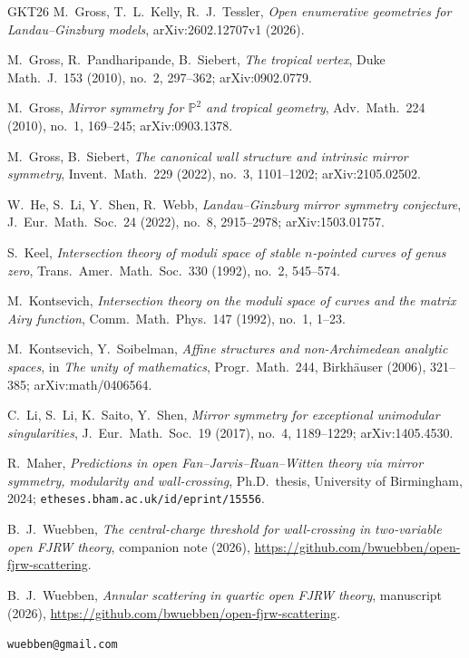 \documentclass[11pt]{amsart}
\theoremstyle{definition}
\theoremstyle{remark}
\newcommand{\PP}{\mathbb{P}}
\begin{document}
\begin{thebibliography}{GKT26}
 M.~Gross, T.~L.~Kelly, R.~J.~Tessler,
\emph{Open enumerative geometries for Landau--Ginzburg models},
arXiv:2602.12707v1 (2026).

 M.~Gross, R.~Pandharipande, B.~Siebert,
\emph{The tropical vertex}, Duke Math.\ J.\ 153 (2010), no.~2, 297--362;
arXiv:0902.0779.

 M.~Gross,
\emph{Mirror symmetry for $\PP^{2}$ and tropical geometry},
Adv.\ Math.\ 224 (2010), no.~1, 169--245; arXiv:0903.1378.

 M.~Gross, B.~Siebert,
\emph{The canonical wall structure and intrinsic mirror symmetry},
Invent.\ Math.\ 229 (2022), no.~3, 1101--1202; arXiv:2105.02502.

 W.~He, S.~Li, Y.~Shen, R.~Webb,
\emph{Landau--Ginzburg mirror symmetry conjecture},
J.\ Eur.\ Math.\ Soc.\ 24 (2022), no.~8, 2915--2978; arXiv:1503.01757.

 S.~Keel,
\emph{Intersection theory of moduli space of stable $n$-pointed curves of
genus zero}, Trans.\ Amer.\ Math.\ Soc.\ 330 (1992), no.~2, 545--574.

 M.~Kontsevich,
\emph{Intersection theory on the moduli space of curves and the matrix Airy
function}, Comm.\ Math.\ Phys.\ 147 (1992), no.~1, 1--23.

 M.~Kontsevich, Y.~Soibelman,
\emph{Affine structures and non-Archimedean analytic spaces}, in
\emph{The unity of mathematics}, Progr.\ Math.\ 244, Birkh\"auser (2006), 321--385;
arXiv:math/0406564.

 C.~Li, S.~Li, K.~Saito, Y.~Shen,
\emph{Mirror symmetry for exceptional unimodular singularities},
J.\ Eur.\ Math.\ Soc.\ 19 (2017), no.~4, 1189--1229; arXiv:1405.4530.

 R.~Maher,
\emph{Predictions in open Fan--Jarvis--Ruan--Witten theory via mirror symmetry,
modularity and wall-crossing}, Ph.D.\ thesis, University of Birmingham, 2024;
\texttt{etheses.bham.ac.uk/id/eprint/15556}.

\enlargethispage{2\baselineskip}
 B.~J.~Wuebben,
\emph{The central-charge threshold for wall-crossing in two-variable open FJRW
theory}, companion note (2026),
\url{https://github.com/bwuebben/open-fjrw-scattering}.

 B.~J.~Wuebben,
\emph{Annular scattering in quartic open FJRW theory}, manuscript (2026),
\url{https://github.com/bwuebben/open-fjrw-scattering}.

\end{thebibliography}

\bigskip
{} \texttt{wuebben@gmail.com}
\end{document}
